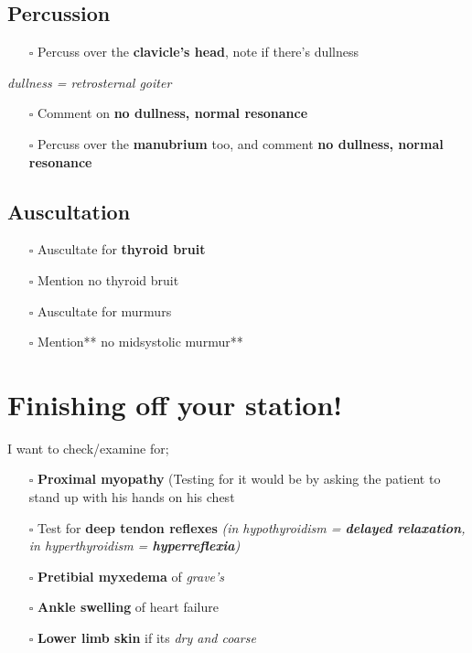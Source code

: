 \documentclass[
  13.5pt,
  a4paper,
  DIV=11,
  numbers=noendperiod]{scrreprt}
\providecommand{\tightlist}{%
  \setlength{\itemsep}{0pt}\setlength{\parskip}{0pt}}
\begin{document}
\subsection{Percussion}\label{percussion}

\begin{itemize}
\tightlist
\item[$\square$]
  Percuss over the \textbf{clavicle's head}, note if there's dullness
\end{itemize}

\emph{dullness = retrosternal goiter}

\begin{itemize}
\tightlist
\item[$\square$]
  Comment on \textbf{no dullness, normal resonance}
\item[$\square$]
  Percuss over the \textbf{manubrium} too, and comment \textbf{no
  dullness, normal resonance}
\end{itemize}

\subsection{Auscultation}\label{auscultation-3}

\begin{itemize}
\tightlist
\item[$\square$]
  Auscultate for \textbf{thyroid bruit}
\item[$\square$]
  Mention no thyroid bruit
\item[$\square$]
  Auscultate for murmurs
\item[$\square$]
  Mention** no midsystolic murmur**
\end{itemize}

\section{Finishing off your station!}\label{finishing-off-your-station}

I want to check/examine for;

\begin{itemize}
\tightlist
\item[$\square$]
  \textbf{Proximal myopathy} (Testing for it would be by asking the
  patient to stand up with his hands on his chest
\item[$\square$]
  Test for \textbf{deep tendon reflexes} \emph{(in hypothyroidism =
  \textbf{delayed relaxation}, in hyperthyroidism =
  \textbf{hyperreflexia})}
\item[$\square$]
  \textbf{Pretibial myxedema} of \emph{grave's}
\item[$\square$]
  \textbf{Ankle swelling} of heart failure
\item[$\square$]
  \textbf{Lower limb skin} if its \emph{dry and coarse}
\end{itemize}
\end{document}
